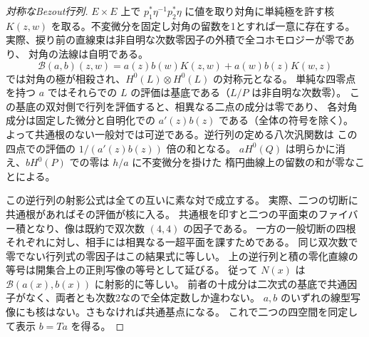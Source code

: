 \begin{proof}[対称なBezout行列]
$E\times E$ 上で $p_1^*\eta^{-1}p_2^*\eta$ に値を取り対角に単純極を許す核
$K(z,w)$ を取る。不変微分を固定し対角の留数を1とすれば一意に存在する。
実際、捩り前の直線束は非自明な次数零因子の外積で全コホモロジーが零であり、
対角の法線は自明である。
\[
 \mathcal B(a,b)(z,w)
   = a(z)b(w)K(z,w)+a(w)b(z)K(w,z)
\]
では対角の極が相殺され、$H^0(L)\otimes H^0(L)$ の対称元となる。
単純な四零点を持つ $a$ ではそれらでの $L$ の評価は基底である（$L/P$ は非自明な次数零）。
この基底の双対側で行列を評価すると、相異なる二点の成分は零であり、
各対角成分は固定した微分と自明化での $a'(z)b(z)$ である（全体の符号を除く）。
よって共通根のない一般対では可逆である。逆行列の定める八次汎関数は
この四点での評価の $1/(a'(z)b(z))$ 倍の和となる。
$aH^0(Q)$ は明らかに消え、$bH^0(P)$ での零は $h/a$ に不変微分を掛けた
楕円曲線上の留数の和が零なことによる。

この逆行列の射影公式は全ての互いに素な対で成立する。
実際、二つの切断に共通根があればその評価が核に入る。
共通根を印すと二つの平面束のファイバー積となり、像は既約で双次数 $(4,4)$ の因子である。
一方の一般切断の四根それぞれに対し、相手には相異なる一超平面を課すためである。
同じ双次数で零でない行列式の零因子はこの結果式に等しい。
上の逆行列と積の零化直線の等号は開集合上の正則写像の等号として延びる。
従って $N(x)$ は $\mathcal B(a(x),b(x))$ に射影的に等しい。
前者の十成分は二次式の基底で共通因子がなく、両者とも次数2なので全体定数しか違わない。
$a,b$ のいずれの線型写像にも核はない。さもなければ共通基点になる。
これで二つの四空間を同定して表示 $b=Ta$ を得る。
\end{proof}

